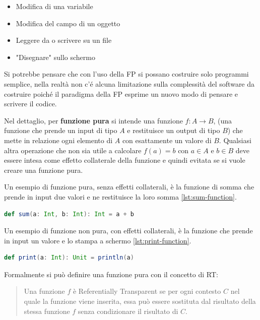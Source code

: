\documentclass[12pt,a4paper,openright,twoside]{book}
\begin{document}
\begin{itemize}
    \item Modifica di una variabile
    \item Modifica del campo di un oggetto
    \item Leggere da o scrivere su un file
    \item "Disegnare" sullo schermo
\end{itemize}

Si potrebbe pensare che con l'uso della \ac{FP} si possano costruire solo programmi semplice, nella realtà non c'é alcuna limitazione sulla complessità del software da costruire poiché il paradigma della FP esprime un nuovo modo di pensare e scrivere il codice.

\label{sec:fp}
Nel dettaglio, per \textbf{funzione pura} si intende una funzione $f:A\to B$, (una funzione che prende un input di tipo $A$ e restituisce un output di tipo $B$) che mette in relazione ogni elemento di $A$ con esattamente un valore di $B$. Qualsiasi altra operazione che non sia utile a calcolare $f(a)=b$ con $a\in A$ e $b\in B$ deve essere intesa come effetto collaterale della funzione e quindi evitata se si vuole creare una funzione pura.

Un esempio di funzione pura, senza effetti collaterali, è la funzione di somma che prende in input due valori e ne restituisce la loro somma \cref{lst:sum-function}. 

\begin{lstlisting}[language=Scala, label={lst:sum-function}, caption={Esempio di funzione pura in Scala}]
    def sum(a: Int, b: Int): Int = a + b
\end{lstlisting}

Un esempio di funzione non pura, con effetti collaterali, è la funzione che prende in input un valore e lo stampa a schermo \cref{lst:print-function}.

\begin{lstlisting}[language=Scala, label={lst:print-function}, caption={Esempio di funzione non pura in Scala}]
    def print(a: Int): Unit = println(a)
\end{lstlisting}

Formalmente si può definire una funzione pura con il concetto di \ac{RT}:

\begin{quote}
    Una funzione $f$ è Referentially Transparent se per ogni contesto $C$ nel quale la funzione viene inserita, essa può essere sostituta dal risultato della stessa funzione $f$ senza condizionare il risultato di $C$.
\end{quote}
\end{document}
